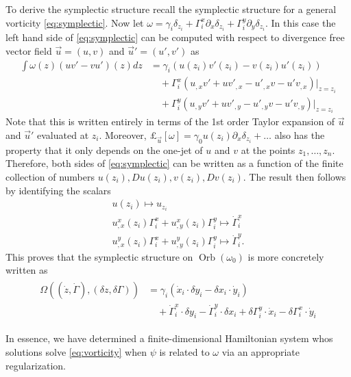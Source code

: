 \documentclass[12pt]{amsart}
\theoremstyle{remark}
\DeclareMathOperator{\Orb}{Orb}
\begin{document}
  To derive the symplectic structure recall the symplectic structure for a general vorticity \eqref{eq:symplectic}.
  Now let $\omega = \gamma_i \delta_{z_i} + \Gamma_i^x \partial_x\delta_{z_i} + \Gamma_i^y \partial_y \delta_{z_i}$.
  In this case the left hand side of \eqref{eq:symplectic} can be computed with respect to 
  divergence free vector field $\vec{u} = (u,v)$ and $\vec{u}' = (u',v')$ as
  \begin{align*}
    \int \omega(z) \left( u v' - v u' \right) (z) dz &= \gamma_i ( u(z_i)v'(z_i) - v(z_i) u'(z_i) ) \\
    &\quad + \Gamma_i^x ( u_{,x} v' + u {v'}_{,x} - {u'}_{,x}v - u' v_{,x})|_{z = z_i} \\
    &\quad + \Gamma_i^y ( u_{,y} v' + u {v'}_{,y} - {u'}_{,y}v - u' v_{,y})|_{z = z_i}
  \end{align*}
  Note that this is written entirely in terms of the 1st order Taylor expansion of $\vec{u}$ and $\vec{u}'$ evaluated 
  at $z_i$.
  Moreover, $\pounds_{\vec{u}}[\omega] = \gamma_0 u(z_i) \partial_x \delta_{z_i} + \dots$
  also has the property that it only depends on
  the one-jet of $u$ and $v$ at the points $z_1,\dots,z_n$.
  Therefore, both sides of \eqref{eq:symplectic}
  can be written as a function of the finite collection of 
  numbers $u(z_i), Du(z_i), v(z_i),Dv(z_i)$.
  The result then follows by identifying the scalars
  \begin{align*}
    u(z_i) \mapsto u_{z_i}\\
    u^x_{,x}(z_i) \Gamma^x_i + u^x_{,y}(z_i) \Gamma^y_i \mapsto \dot{\Gamma}_i^x \\
    u^y_{,x}(z_i) \Gamma^x_i + u^y_{,y}(z_i) \Gamma^y_i \mapsto \dot{\Gamma}_i^y.
    \end{align*}
 This proves that the symplectic structure on $\Orb(\omega_0)$ is more concretely written as
  \begin{align}
  \begin{split}
    \Omega( (\dot{z},\dot{\Gamma}), (\delta z,\delta \Gamma) ) &=
    \gamma_i ( \dot{x}_i \cdot \delta y_i - \delta x_i \cdot \dot{y}_i ) \\
    &\quad + \dot{\Gamma}_i^x \cdot \delta y_i
    - \dot{\Gamma}_i^y \cdot \delta x_i
    + \delta \Gamma_i^y \cdot \dot{x}_i 
    - \delta \Gamma_i^x \cdot \dot{y}_i
    \end{split} \label{eq:first_order_symplectic}
  \end{align}

In essence, we have determined a finite-dimensional Hamiltonian system whos solutions solve \eqref{eq:vorticity} when $\psi$ is related to $\omega$ via an appropriate regularization.
\end{document}
